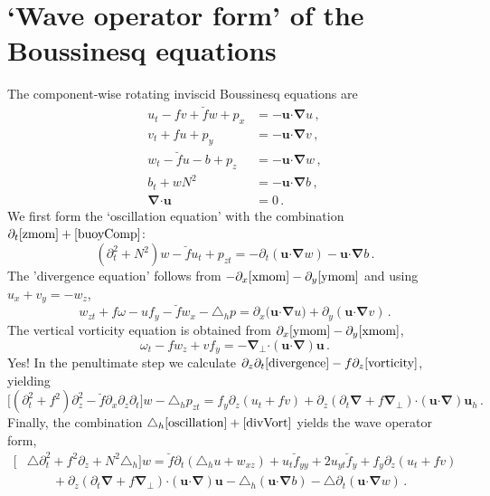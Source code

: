 \documentclass[12pt, oneside]{article}
\newcommand{\com}{\, ,}
\newcommand{\per}{\, .}
\newcommand{\beq}{\begin{equation}}
\newcommand{\eeq}{\end{equation}}
\newcommand{\p}{\partial}
\newcommand{\bnabla}{\boldsymbol \nabla}
\newcommand{\pnabla}{\boldsymbol \nabla_{\! \! \perp}}
\newcommand{\bcdot}{\boldsymbol \cdot}
\newcommand{\hlap}{\triangle_h}
\newcommand{\lap}{\triangle}
\newcommand{\bu}{\boldsymbol u}
\newcommand{\buh}{\boldsymbol u_h}
\newcommand{\fh}{\breve f}
\begin{document}
\section{`Wave operator form' of the Boussinesq equations}
\label{waveOperatorForm}

The component-wise rotating inviscid Boussinesq equations are
\begin{align}
u_t - f v + \fh w + p_x &= - \bu \bcdot \bnabla u \com \label{xmom} \\
v_t + f u + p_y &= - \bu \bcdot \bnabla v \com \label{ymom} \\
w_t - \fh u - b + p_z &= - \bu \bcdot \bnabla w \com \label{zmom} \\
b_t + w N^2 &= - \bu \bcdot \bnabla b \com \label{buoyComp} \\
\bnabla \bcdot \bu &= 0 \label{contComp} \per
\end{align}
We first form the `oscillation equation' with the combination $\p_t \eqref{zmom} + \eqref{buoyComp}$:
\beq
\left ( \p_t^2 + N^2 \right ) w - \fh u_t + p_{zt} = - \p_t \left ( \bu \bcdot \bnabla w \right ) - \bu \bcdot \bnabla b \per 
\label{oscillation}
\eeq
The 'divergence equation' follows from $- \p_x \eqref{xmom}- \p_y \eqref{ymom}$ and using $u_x + v_y = - w_z$, 
\beq
w_{zt} + f \omega - u f_y  -  \fh w_x - \hlap p =  \p_x \big ( \bu \bcdot \bnabla u \big ) + \p_y \left ( \bu \bcdot \bnabla v \right ) \per
\label{divergence}
\eeq
The vertical vorticity equation is obtained from $\p_x \eqref{ymom} - \p_y \eqref{xmom}$, 
\beq
\omega_t - f w_z + v f_y = - \pnabla \bcdot \left ( \bu \bcdot \bnabla \right ) \bu \per
\label{vorticity}
\eeq
Yes! In the penultimate step we calculate $\p_z \p_t \eqref{divergence} - f \p_z \eqref{vorticity}$, yielding
\beq
\Big [  \left ( \p_t^2 + f^2 \right ) \p_z^2 - \fh \p_x \p_z \p_t \Big ] w - \hlap p_{zt} = f_y \p_z \left ( u_t + f v \right ) + \p_z \left ( \p_t \bnabla + f \pnabla \right ) \bcdot \left ( \bu \bcdot \bnabla \right ) \buh \per
\label{divVort}
\eeq
Finally, the combination $\hlap \eqref{oscillation} + \eqref{divVort}$ yields the wave operator form,
\beq
\begin{split}
\Big [&  \lap \p_t^2 + f^2 \p_z + N^2 \hlap \Big ] w = \fh \p_t \left ( \hlap u + w_{xz} \right ) + u_t \fh_{yy} + 2 u_{yt} \fh_{y}  + f_y \p_z \left ( u_t + f v \right ) \\
& \qquad  + \p_z \left ( \p_t \bnabla + f \pnabla \right ) \bcdot \left ( \bu \bcdot \bnabla \right ) \bu - \hlap \left ( \bu \bcdot \bnabla b \right ) - \lap \p_t \left ( \bu \bcdot \bnabla w \right ) \per
\end{split}
\label{waveOperatorEqn}
\eeq



\end{document}
